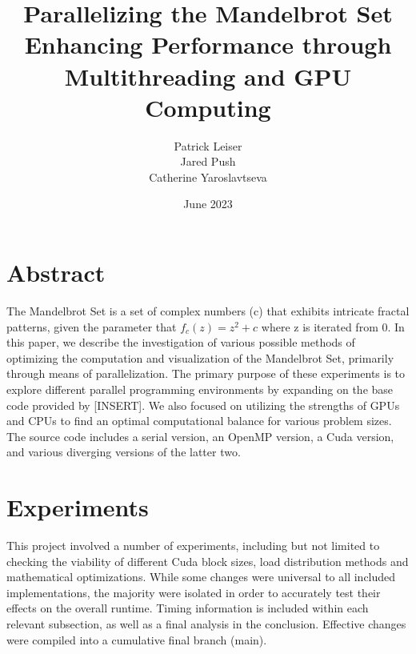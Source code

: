 \documentclass{article}
\begin{document}
\title{\textbf{Parallelizing the Mandelbrot Set \\ \large Enhancing Performance through Multithreading and GPU Computing}}
\author{\begin{tabular}{cc}Patrick Leiser\\
Jared Push\\Catherine Yaroslavtseva\\\end{tabular}}

\date{June 2023}

\maketitle

\section{Abstract}

The Mandelbrot Set is a set of complex numbers (c) that exhibits intricate fractal patterns, given the parameter that $f_c(z) = z^2 + c$ where z is iterated from 0. In this paper, we describe the investigation of various possible methods of optimizing the computation and visualization of the Mandelbrot Set, primarily through means of parallelization. The primary purpose of these experiments is to explore different parallel programming environments by expanding on the base code provided by [INSERT]. We also focused on utilizing the strengths of GPUs and CPUs to find an optimal computational balance for various problem sizes.\\ 

The source code includes a serial version, an OpenMP version, a Cuda version, and various diverging versions of the latter two. 

\section{Experiments}

This project involved a number of experiments, including but not limited to checking the viability of different Cuda block sizes, load distribution methods and mathematical optimizations. While some changes were universal to all included implementations, the majority were isolated in order to accurately test their effects on the overall runtime. Timing information is included within each relevant subsection, as well as a final analysis in the conclusion. Effective changes were compiled into a cumulative final branch (main).
\end{document}
